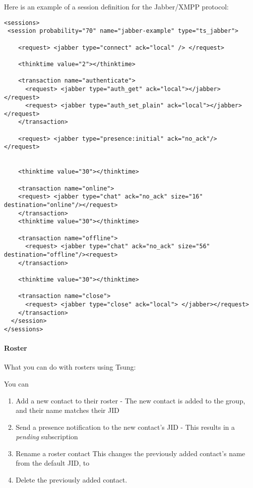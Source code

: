 \documentclass{TSUNG-en}
\begin{document}
\label{sec:sessions:jabber}
\par Here is an example of a session definition for the Jabber/XMPP protocol:
\begin{Verbatim}
<sessions>
 <session probability="70" name="jabber-example" type="ts_jabber">

    <request> <jabber type="connect" ack="local" /> </request>

    <thinktime value="2"></thinktime>

    <transaction name="authenticate">
      <request> <jabber type="auth_get" ack="local"></jabber> </request>
      <request> <jabber type="auth_set_plain" ack="local"></jabber> </request>
    </transaction>

    <request> <jabber type="presence:initial" ack="no_ack"/> </request>


    <thinktime value="30"></thinktime>

    <transaction name="online">
    <request> <jabber type="chat" ack="no_ack" size="16" destination="online"/></request>
    </transaction>
    <thinktime value="30"></thinktime>

    <transaction name="offline">
      <request> <jabber type="chat" ack="no_ack" size="56" destination="offline"/><request>
    </transaction>

    <thinktime value="30"></thinktime>

    <transaction name="close">
      <request> <jabber type="close" ack="local"> </jabber></request>
    </transaction>
  </session>
</sessions>
\end{Verbatim}

\paragraph{Roster}

What you can do with rosters using Tsung:

You can
\begin{enumerate}
\item  Add a new contact to their roster
   - The new contact is added to the  group, and their name matches their JID
\item  Send a  presence notification to the new contact's JID
   - This results in a \emph{pending} subscription
 \item  Rename a roster contact
    This changes the previously added contact's name from the default JID, to 
  \item Delete the previously added contact.
\end{enumerate}
\end{document}
